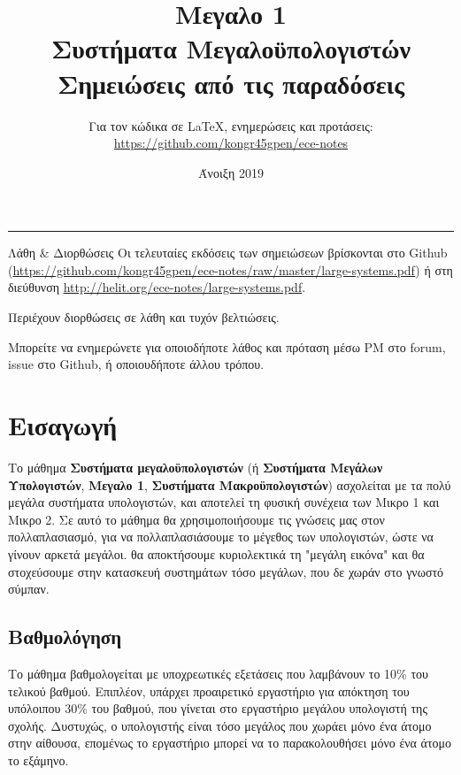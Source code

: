\documentclass[11pt,a4paper,notitlepage,fleqn]{article}
\title{Μεγαλο 1
	\\
	{ 
		\normalsize Συστήματα Μεγαλοϋπολογιστών
		\\
		\normalsize Σημειώσεις από τις παραδόσεις}
	}
\date{Άνοιξη 2019
	\\
	{ 
	}
}
\author{
	Για τον κώδικα σε \LaTeX, ενημερώσεις και προτάσεις:
	\\
	\url{https://github.com/kongr45gpen/ece-notes}}
\let\mytodo\todo
\renewcommand{\todo}[1]{\par\mytodo[inline,noline]{#1}}
\begin{document}
\maketitle

\hrule
\vspace{50pt}

\begin{infobox}{Λάθη \& Διορθώσεις}
	Οι τελευταίες εκδόσεις των σημειώσεων βρίσκονται στο Github
	(\url{https://github.com/kongr45gpen/ece-notes/raw/master/large-systems.pdf}) ή
	στη διεύθυνση \url{http://helit.org/ece-notes/large-systems.pdf}.
	
	Περιέχουν διορθώσεις σε λάθη και τυχόν βελτιώσεις.
	
	\tcblower
	
	Μπορείτε να ενημερώνετε για οποιοδήποτε λάθος και πρόταση
	μέσω PM στο forum, issue στο Github, ή οποιουδήποτε άλλου τρόπου.
\end{infobox}

\todo{Add PDF links}

{
	\hypersetup{linkcolor=black}
	\tableofcontents
}

\newpage

\section{Εισαγωγή}
Το μάθημα \textbf{Συστήματα μεγαλοϋπολογιστών} (ή \textbf{Συστήματα Μεγάλων Υπολογιστών}, \textbf{Μεγαλο 1}, \textbf{Συστήματα Μακροϋπολογιστών}) ασχολείται με τα πολύ μεγάλα συστήματα υπολογιστών, και αποτελεί τη φυσική συνέχεια των Μικρο 1 και Μικρο 2. Σε αυτό το μάθημα θα χρησιμοποιήσουμε τις γνώσεις μας στον πολλαπλασιασμό, για να πολλαπλασιάσουμε το μέγεθος των υπολογιστών, ώστε να γίνουν αρκετά μεγάλοι. θα αποκτήσουμε κυριολεκτικά τη "μεγάλη εικόνα" και θα στοχεύσουμε στην κατασκευή συστημάτων τόσο μεγάλων, που δε χωράν στο γνωστό σύμπαν.

\subsection*{Βαθμολόγηση}
Το μάθημα βαθμολογείται με υποχρεωτικές εξετάσεις που λαμβάνουν το 10\% του τελικού βαθμού. Επιπλέον, υπάρχει προαιρετικό εργαστήριο για απόκτηση του υπόλοιπου 30\% του βαθμού, που γίνεται στο εργαστήριο μεγάλου υπολογιστή της σχολής. Δυστυχώς, ο υπολογιστής είναι τόσο μεγάλος που χωράει μόνο ένα άτομο στην αίθουσα, επομένως το εργαστήριο μπορεί να το παρακολουθήσει μόνο ένα άτομο το εξάμηνο.
\end{document}
